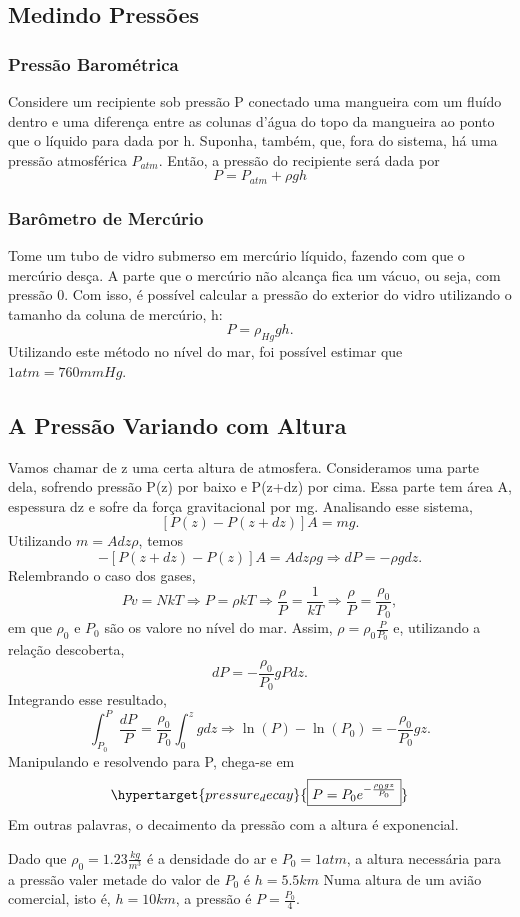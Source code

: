 \documentclass[physicsII_notes.tex]{subfiles}
\begin{document}
\subsection{Medindo Pressões}
\subsubsection{Pressão Barométrica}
Considere um recipiente sob pressão P conectado uma mangueira com um fluído dentro e uma diferença entre as colunas d'água
do topo da mangueira ao ponto que o líquido para dada por h. Suponha, também, que, fora do sistema, há uma pressão atmosférica \(P_{atm}\).
Então, a pressão do recipiente será dada por
\[
	P = P_{atm} + \rho gh
\]
\subsubsection{Barômetro de Mercúrio}
Tome um tubo de vidro submerso em mercúrio líquido, fazendo com que o mercúrio desça. A parte que o mercúrio não alcança fica um vácuo, ou seja, com pressão 0.
Com isso, é possível calcular a pressão do exterior do vidro utilizando o tamanho da coluna de mercúrio, h:
\[
	P = \rho_{Hg}gh.
\]
Utilizando este método no nível do mar, foi possível estimar que \(1atm = 760mmHg\).

\subsection{A Pressão Variando com Altura}
Vamos chamar de z uma certa altura de atmosfera. Consideramos uma parte dela, sofrendo pressão P(z) por baixo e P(z+dz) por cima. Essa parte tem área A, espessura dz e sofre
da força gravitacional por mg. Analisando esse sistema,
\[
	[P(z) - P(z+dz)]A = mg.
\]
Utilizando \(m = Adz\rho \), temos
\[
	-[P(z+dz)-P(z)]A = Adz\rho g \Rightarrow dP = -\rho g dz.
\]
Relembrando o caso dos gases,
\[
	Pv = NkT \Rightarrow P = \rho kT \Rightarrow \frac{\rho }{P} = \frac{1}{kT} \Rightarrow \frac{\rho }{P}=\frac{\rho_{0}}{P_{0}},
\]
em que \(\rho_{0}\) e \(P_{0}\) são os valore no nível do mar. Assim, \(\rho = \rho_{0} \frac{P}{P_{0}}\) e, utilizando a relação descoberta,
\[
	dP = -\frac{\rho_{0}}{P_{0}}gPdz.
\]
Integrando esse resultado,
\[
	\int_{P_{0}}^{P}\frac{dP}{P} = \frac{\rho_{0}}{P_{0}}\int_{0}^{z}gdz \Rightarrow \ln{(P)}-\ln{(P_{0})} = -\frac{\rho_{0}}{P_{0}}gz.
\]
Manipulando e resolvendo para P, chega-se em
\[
	\hypertarget{pressure_decay}{\boxed{P = P_{0}e^{-\frac{\rho_{0}gz}{P_{0}}}}}
\]
Em outras palavras, o decaimento da pressão com a altura é exponencial.
\begin{example}
	Dado que \(\rho_{0} = 1.23\frac{kg}{m^{3}}\) é a densidade do ar e \(P_{0} = 1atm\), a altura necessária para a pressão valer metade do valor de \(P_{0}\) é \(h = 5.5km\)
	Numa altura de um avião comercial, isto é, \(h=10km\), a pressão é \(P = \frac{P_{0}}{4}\).
\end{example}
\end{document}
